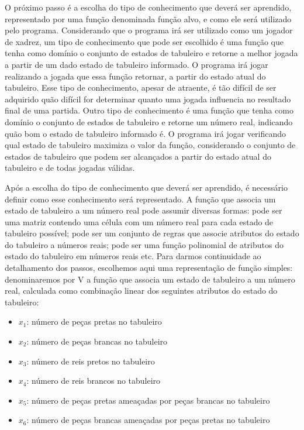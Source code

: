O próximo passo é a escolha do tipo de conhecimento que deverá ser aprendido, representado por uma função denominada função alvo, e como ele será utilizado pelo programa. Considerando que o programa irá ser utilizado como um jogador de xadrez, um tipo de conhecimento que pode ser escolhido é uma função que tenha como domínio o conjunto de estados de tabuleiro e retorne a melhor jogada a partir de um dado estado de tabuleiro informado. O programa irá jogar realizando a jogada que essa função retornar, a partir do estado atual do tabuleiro. Esse tipo de conhecimento, apesar de atraente, é tão difícil de ser adquirido quão difícil for determinar quanto uma jogada influencia no resultado final de uma partida. Outro tipo de conhecimento é uma função que tenha como domínio o conjunto de estados de tabuleiro e retorne um número real, indicando quão bom o estado de tabuleiro informado é. O programa irá jogar verificando qual estado de tabuleiro maximiza o valor da função, considerando o conjunto de estados de tabuleiro que podem ser alcançados a partir do estado atual do tabuleiro e de todas jogadas válidas.


Após a escolha do tipo de conhecimento que deverá ser aprendido, é necessário definir como esse conhecimento será representado. A função que associa um estado de tabuleiro a um número real pode assumir diversas formas: pode ser uma matriz contendo uma célula com um número real para cada estado de tabuleiro possível; pode ser um conjunto de regras que associe atributos do estado do tabuleiro a números reais; pode ser uma função polinomial de atributos do estado do tabuleiro em números reais etc. Para darmos continuidade ao detalhamento dos passos, escolhemos aqui uma representação de função simples: denominaremos por V a função que associa um estado de tabuleiro a um número real, calculada como combinação linear dos seguintes atributos do estado do tabuleiro:

\begin{itemize}
\item $x_1$: número de peças pretas no tabuleiro
\item $x_2$: número de peças brancas no tabuleiro
\item $x_3$: número de reis pretos no tabuleiro
\item $x_4$: número de reis brancos no tabuleiro
\item $x_5$: número de peças pretas ameaçadas por peças brancas no tabuleiro
\item $x_6$: número de peças brancas ameaçadas por peças pretas no tabuleiro
\end{itemize}

